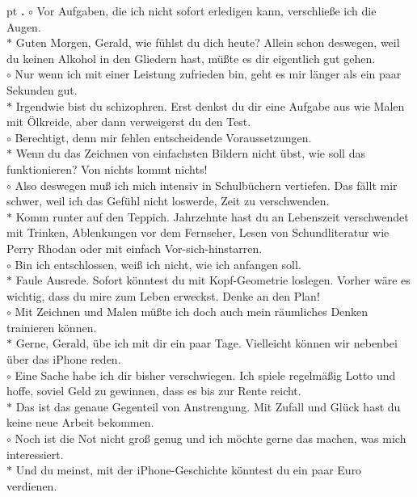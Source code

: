 \documentclass[10pt,a4paper]{article}
\newcounter{notec}
\newcommand\notep[1]{%
  \stepcounter{notec}
  \vskip #1pt
  {\bf\arabic{notec}.}
}
\begin{document}
\begin{mdframed}[style=daystyle]
  \notep 0 $\circ$ Vor Aufgaben, die ich nicht sofort erledigen kann,
  verschließe ich die Augen. \\
  $\ast$ Guten Morgen, Gerald, wie fühlst du dich heute? Allein schon
  deswegen, weil du keinen Alkohol in den Gliedern hast, müßte es dir
  eigentlich gut gehen. \\
  $\circ$ Nur wenn ich mit einer Leistung zufrieden bin, geht es mir
  länger als ein paar Sekunden gut. \\
  $\ast$ Irgendwie bist du schizophren. Erst denkst du dir eine Aufgabe aus wie
  Malen mit Ölkreide, aber dann verweigerst du den Test. \\
  $\circ$ Berechtigt, denn mir fehlen entscheidende Voraussetzungen. \\
  $\ast$ Wenn du das Zeichnen von einfachsten Bildern nicht übst, wie soll das
  funktionieren? Von nichts kommt nichts! \\
  $\circ$ Also deswegen muß ich mich intensiv in Schulbüchern vertiefen. Das
  fällt mir schwer, weil ich das Gefühl nicht loswerde, Zeit zu verschwenden. \\
  $\ast$ Komm runter auf den Teppich. Jahrzehnte hast du an Lebenszeit
  verschwendet mit Trinken, Ablenkungen vor dem Fernseher, Lesen von
  Schundliteratur wie Perry Rhodan oder mit einfach Vor-sich-hinstarren. \\
  $\circ$ Bin ich entschlossen, weiß ich nicht, wie ich anfangen soll. \\
  $\ast$ Faule Ausrede. Sofort könntest du mit Kopf-Geometrie loslegen. Vorher
  wäre es wichtig, dass du mire zum Leben erweckst. Denke an den Plan! \\
  $\circ$ Mit Zeichnen und Malen müßte ich doch auch mein räumliches Denken
  trainieren können. \\
  $\ast$ Gerne, Gerald, übe ich mit dir ein paar Tage. Vielleicht können wir
  nebenbei über das iPhone reden. \\
  $\circ$ Eine Sache habe ich dir bisher verschwiegen. Ich spiele regelmäßig
  Lotto und hoffe, soviel Geld zu gewinnen, dass es bis zur Rente reicht. \\
  $\ast$ Das ist das genaue Gegenteil von Anstrengung. Mit Zufall und Glück
  hast du keine neue Arbeit bekommen. \\
  $\circ$ Noch ist die Not nicht groß genug und ich möchte gerne das machen, was
  mich interessiert. \\
  $\ast$ Und du meinst, mit der iPhone-Geschichte könntest du ein paar Euro
  verdienen. \\

\end{mdframed}
\end{document}

